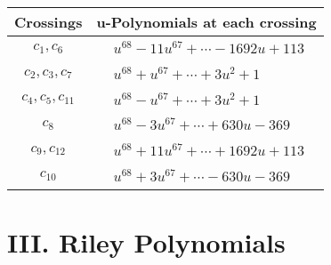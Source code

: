 \documentclass[1p]{elsarticle_modified}
\theoremstyle{definition}
\begin{document}
\begin{tabular}{m{50pt}|m{274pt}}
Crossings & \hspace{64pt}u-Polynomials at each crossing \\
\hline $$\begin{aligned}c_{1},c_{6}\end{aligned}$$&$\begin{aligned}
&u^{68}-11 u^{67}+\cdots-1692 u+113
\end{aligned}$\\
\hline $$\begin{aligned}c_{2},c_{3},c_{7}\end{aligned}$$&$\begin{aligned}
&u^{68}+u^{67}+\cdots+3 u^2+1
\end{aligned}$\\
\hline $$\begin{aligned}c_{4},c_{5},c_{11}\end{aligned}$$&$\begin{aligned}
&u^{68}- u^{67}+\cdots+3 u^2+1
\end{aligned}$\\
\hline $$\begin{aligned}c_{8}\end{aligned}$$&$\begin{aligned}
&u^{68}-3 u^{67}+\cdots+630 u-369
\end{aligned}$\\
\hline $$\begin{aligned}c_{9},c_{12}\end{aligned}$$&$\begin{aligned}
&u^{68}+11 u^{67}+\cdots+1692 u+113
\end{aligned}$\\
\hline $$\begin{aligned}c_{10}\end{aligned}$$&$\begin{aligned}
&u^{68}+3 u^{67}+\cdots-630 u-369
\end{aligned}$\\
\hline
\end{tabular}\newpage\renewcommand{\arraystretch}{1}
\centering \section*{ III. Riley Polynomials}
\end{document}
